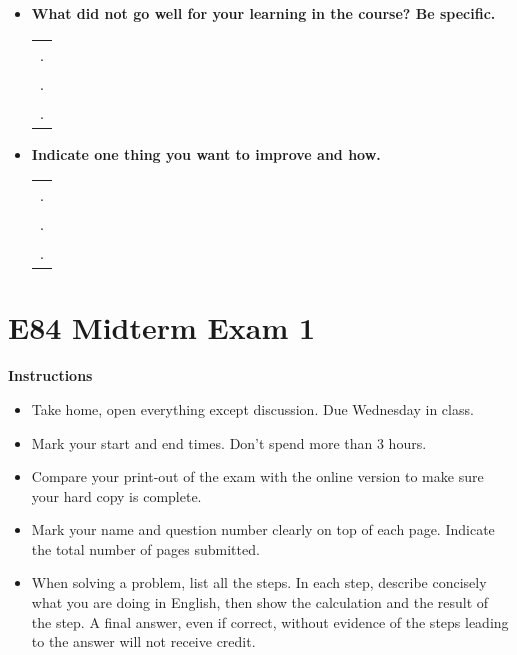 \begin{itemize}
\begin{itemize}
\begin{tabular}{l}
.  \\
.  \\
.  \\
\end{tabular}
\vskip 5cm

\item {\bf What did not go well for your learning in the course? Be specific.}
\begin{tabular}{l}
.  \\
.  \\
.  \\
\end{tabular}
\vskip 0.9in

\item {\bf Indicate one thing you want to improve and how.}
\begin{tabular}{l}
.  \\
.  \\
.  \\
\end{tabular}
\vskip 0.9in

\end{itemize}

\end{itemize}


\section*{E84 Midterm Exam 1}

{\bf Instructions}
\begin{itemize}
\item Take home, open everything except discussion. Due Wednesday in class.
\item Mark your start and end times. Don't spend more than 3 hours.
\item Compare your print-out of the exam with the online version to make
	sure your hard copy is complete.
\item Mark your name and question number clearly on top of each page.
	Indicate the total number of pages submitted.
\item When solving a problem, list all the steps. In each step, describe 
	concisely what you are doing in English, then show the calculation 
	and the result of the step. A final answer, even if correct, without 
	evidence of the steps leading to the answer will not receive credit.
\end{itemize}

